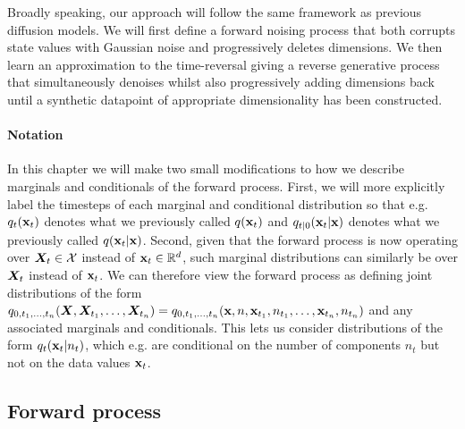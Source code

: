 Broadly speaking, our approach will follow the same framework as previous diffusion models. We will first define a forward noising process that both corrupts state values with Gaussian noise and progressively deletes dimensions.
We then learn an approximation to the time-reversal giving a reverse generative process that simultaneously denoises whilst also progressively adding dimensions back until a synthetic datapoint of appropriate dimensionality has been constructed.

\paragraph{Notation}
In this chapter we will make two small modifications to how we describe marginals and conditionals of the forward process. First, we will more explicitly label the timesteps of each marginal and conditional distribution so that e.g. $q_t({\mathbf{x}}_t)$ denotes what we previously called $q({\mathbf{x}}_t)$ and $q_{t|0}({\mathbf{x}}_t|{\mathbf{x}})$ denotes what we previously called $q({\mathbf{x}}_t|{\mathbf{x}})$. Second, given that the forward process is now operating over ${\bm{X}}_t \in {\mathcal{X}}$ instead of ${\mathbf{x}}_t \in \mathbb{R}^{d}$, such marginal distributions can similarly be over ${\bm{X}}_t$ instead of ${\mathbf{x}}_t$. We can therefore view the forward process as defining joint distributions of the form $q_{0,t_1,\ldots,t_n}({\bm{X}},{\bm{X}}_{t_1},\ldots,{\bm{X}}_{t_n}) = q_{0,t_1,\ldots,t_n}({\mathbf{x}},n,{\mathbf{x}}_{t_1},n_{t_1},\ldots,{\mathbf{x}}_{t_n},n_{t_n})$ and any associated marginals and conditionals. This lets us consider distributions of the form $q_t({\mathbf{x}}_t|n_t)$, which e.g. are conditional on the number of components $n_t$ but not on the data values ${\mathbf{x}}_t$.

\subsection{Forward process}
\label{sec:tddm-jump-diff-proc}

